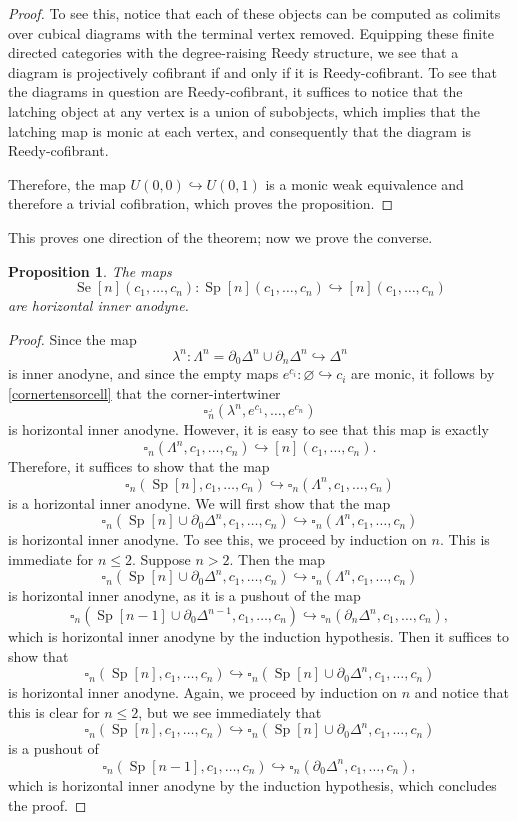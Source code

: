 \documentclass[a4paper]{article}
\numberwithin{equation}{subsection}
\theoremstyle{plain}   %
\newtheorem{prop}[equation]{Proposition}
\theoremstyle{definition}
\theoremstyle{remark}
\theoremstyle{plain}
\begin{document}
\begin{proof}
	To see this, notice that each of these objects can be computed as colimits over cubical diagrams with the terminal vertex removed.  Equipping these finite directed categories with the degree-raising Reedy structure, we see that a diagram is projectively cofibrant if and only if it is Reedy-cofibrant.  To see that the diagrams in question are Reedy-cofibrant, it suffices to notice that the latching object at any vertex is a union of subobjects, which implies that the latching map is monic at each vertex, and consequently that the diagram is Reedy-cofibrant. 
	
	Therefore, the map \(U(0,0)\hookrightarrow U(0,1)\) is a monic weak equivalence and therefore a trivial cofibration, which proves the proposition.
\end{proof}
This proves one direction of the theorem; now we prove the converse.
\begin{prop} The maps \[\operatorname{Se}[n](c_1,\dots,c_n):\operatorname{Sp}[n](c_1,\dots,c_n) \hookrightarrow [n](c_1,\dots,c_n)\] are horizontal inner anodyne.
\end{prop}
\begin{proof} 
	Since the map 
	\[\lambda^n: \Lambda^n=\partial_0 \Delta^n \cup \partial_n\Delta^n \hookrightarrow \Delta^n\]
	is inner anodyne, and since the empty maps \(e^{c_i}:\varnothing \hookrightarrow c_i\) are monic, it follows by \ref{cornertensorcell} that the corner-intertwiner 
	\[\square^\lrcorner_n(\lambda^n,e^{c_1},\dots,e^{c_n})\]
	is horizontal inner anodyne.  However, it is easy to see that this map is exactly \[\square_n(\Lambda^n,c_1,\dots,c_n) \hookrightarrow [n](c_1,\dots,c_n).\]  Therefore, it suffices to show that the map 
	\[\square_n(\operatorname{Sp}[n],c_1,\dots,c_n) \hookrightarrow \square_n(\Lambda^n,c_1,\dots,c_n)\] is a horizontal inner anodyne.  We will first show that the map 
	\[\square_n(\operatorname{Sp}[n]\cup \partial_0\Delta^n,c_1,\dots,c_n) \hookrightarrow \square_n(\Lambda^n,c_1,\dots,c_n)\] is horizontal inner anodyne.  
	To see this, we proceed by induction on \(n\).  This is immediate for \(n\leq 2\). Suppose \(n>2\).  Then the map 
	\[\square_n(\operatorname{Sp}[n]\cup \partial_0\Delta^n,c_1,\dots,c_n) \hookrightarrow \square_n(\Lambda^n,c_1,\dots,c_n)\] is horizontal inner anodyne, as it is a pushout of the map 
	\[\square_n(\operatorname{Sp}[n-1]\cup \partial_0\Delta^{n-1},c_1,\dots,c_n) \hookrightarrow \square_n(\partial_n \Delta^n,c_1,\dots,c_n),\]
	which is horizontal inner anodyne by the induction hypothesis.  Then it suffices to show that 
	\[\square_n(\operatorname{Sp}[n],c_1,\dots,c_n) \hookrightarrow \square_n(\operatorname{Sp}[n]\cup \partial_0\Delta^n,c_1,\dots,c_n)\] is horizontal inner anodyne.  Again, we proceed by induction on \(n\) and notice that this is clear for \(n\leq 2\), but we see immediately that \[\square_n(\operatorname{Sp}[n],c_1,\dots,c_n) \hookrightarrow \square_n(\operatorname{Sp}[n]\cup \partial_0\Delta^n,c_1,\dots,c_n)\] is a pushout of 
	\[\square_n(\operatorname{Sp}[n-1],c_1,\dots,c_n) \hookrightarrow \square_n(\partial_0 \Delta^n ,c_1,\dots,c_n),\]
	which is horizontal inner anodyne by the induction hypothesis, which concludes the proof.
\end{proof}
\end{document}
